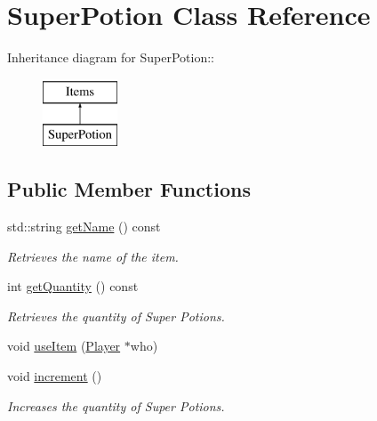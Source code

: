 \hypertarget{classSuperPotion}{
\section{SuperPotion Class Reference}
\label{classSuperPotion}
}
Inheritance diagram for SuperPotion::\begin{figure}[H]
\begin{center}
\leavevmode
\includegraphics[height=2cm]{classSuperPotion}
\end{center}
\end{figure}
\subsection*{Public Member Functions}
\begin{DoxyCompactItemize}
\item 
\hypertarget{classSuperPotion_a6d102538a00d2f865eb9050951513476}{
std::string \hyperlink{classSuperPotion_a6d102538a00d2f865eb9050951513476}{getName} () const }
\label{classSuperPotion_a6d102538a00d2f865eb9050951513476}

\begin{DoxyCompactList}\small\item\em Retrieves the name of the item. \item\end{DoxyCompactList}\item 
\hypertarget{classSuperPotion_a2e74073e0009b9e245def16e3594f07b}{
int \hyperlink{classSuperPotion_a2e74073e0009b9e245def16e3594f07b}{getQuantity} () const }
\label{classSuperPotion_a2e74073e0009b9e245def16e3594f07b}

\begin{DoxyCompactList}\small\item\em Retrieves the quantity of Super Potions. \item\end{DoxyCompactList}\item 
void \hyperlink{classSuperPotion_aeffd98169f47e0b0e0cabd7cd4d25229}{useItem} (\hyperlink{classPlayer}{Player} $\ast$who)
\item 
\hypertarget{classSuperPotion_abd3f95579f349f5b5a2e4b1a16ed502c}{
void \hyperlink{classSuperPotion_abd3f95579f349f5b5a2e4b1a16ed502c}{increment} ()}
\label{classSuperPotion_abd3f95579f349f5b5a2e4b1a16ed502c}

\begin{DoxyCompactList}\small\item\em Increases the quantity of Super Potions. \item\end{DoxyCompactList}\end{DoxyCompactItemize}


